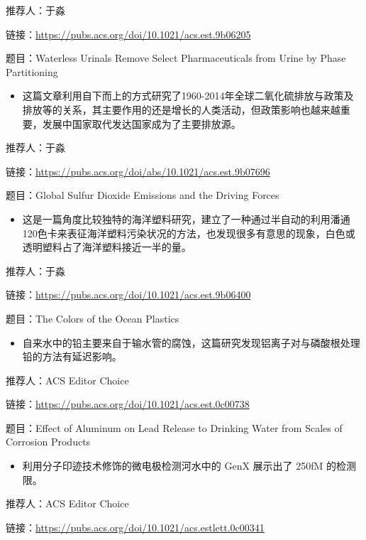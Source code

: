 \documentclass[]{book}
\providecommand{\tightlist}{%
  \setlength{\itemsep}{0pt}\setlength{\parskip}{0pt}}
\begin{document}
推荐人：于淼

链接：\url{https://pubs.acs.org/doi/10.1021/acs.est.9b06205}

题目：Waterless Urinals Remove Select Pharmaceuticals from Urine by Phase Partitioning

\begin{itemize}
\tightlist
\item
  这篇文章利用自下而上的方式研究了1960-2014年全球二氧化硫排放与政策及排放等的关系，其主要作用的还是增长的人类活动，但政策影响也越来越重要，发展中国家取代发达国家成为了主要排放源。
\end{itemize}

推荐人：于淼

链接：\url{https://pubs.acs.org/doi/abs/10.1021/acs.est.9b07696}

题目：Global Sulfur Dioxide Emissions and the Driving Forces

\begin{itemize}
\tightlist
\item
  这是一篇角度比较独特的海洋塑料研究，建立了一种通过半自动的利用潘通120色卡来表征海洋塑料污染状况的方法，也发现很多有意思的现象，白色或透明塑料占了海洋塑料接近一半的量。
\end{itemize}

推荐人：于淼

链接：\url{https://pubs.acs.org/doi/10.1021/acs.est.9b06400}

题目：The Colors of the Ocean Plastics

\begin{itemize}
\tightlist
\item
  自来水中的铅主要来自于输水管的腐蚀，这篇研究发现铝离子对与磷酸根处理铅的方法有延迟影响。
\end{itemize}

推荐人：ACS Editor Choice

链接：\url{https://pubs.acs.org/doi/10.1021/acs.est.0c00738}

题目：Effect of Aluminum on Lead Release to Drinking Water from Scales of Corrosion Products

\begin{itemize}
\tightlist
\item
  利用分子印迹技术修饰的微电极检测河水中的 GenX 展示出了 250fM 的检测限。
\end{itemize}

推荐人：ACS Editor Choice

链接：\url{https://pubs.acs.org/doi/10.1021/acs.estlett.0c00341}
\end{document}
